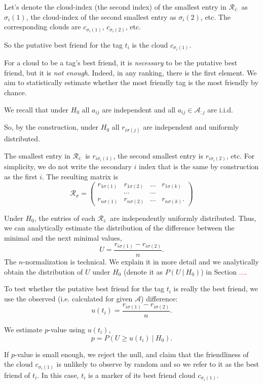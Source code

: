 \documentclass{llncs}
\begin{document}
Let's denote the cloud-index (the second index) of the smallest entry in $\mathcal{R}_{i:}$ as $\sigma_i(1)$, the cloud-index of the second smallest entry as ${\sigma_i(2)}$, etc. The corresponding clouds are $c_{\sigma_{i}(1)}$, $c_{\sigma_{i}(2)}$, etc. 

So the putative best friend for the tag $t_i$ is the cloud $c_{\sigma_{i}(1)}$.

For a cloud to be a tag's best friend, it is \textit{necessary} to be the putative best friend, but it is \textit{not enough}. Indeed, in any ranking, there is the first element. We aim to statistically estimate whether the most friendly tag is the most friendly by chance. 

We recall that under $H_0$ all $a_{ij}$ are independent and all $a_{ij} \in \mathcal{A}_{:j}$ are i.i.d.

So, by the construction, under $H_0$ all $r_{i\sigma(j)}$ are independent and uniformly distributed.

The smallest entry in $\mathcal{R}_{i:}$ is $r_{i\sigma_i(1)}$, the second smallest entry is $r_{i\sigma_i(2)}$, etc. For simplicity, we do not write the secondary $i$ index that is the same by construction as the first $i$. The resulting matrix is 
\[
\mathcal{R}_{\sigma} = \begin{pmatrix}
r_{1\sigma(1)} & r_{1\sigma(2)} & \dots & r_{1\sigma(k)} \\
       &\cdots & \cdots &  \\
r_{n\sigma(1)} & r_{n\sigma(2)} & \dots & r_{n\sigma(k)}.
\end{pmatrix}
\]

Under $H_0$, the entries of each $\mathcal{R}_{i:}$ are independently uniformly distributed. Thus, we can analytically estimate the distribution of the difference between the minimal and the next minimal values,
\[
U = \frac{r_{i\sigma(1)} - r_{i\sigma(2)}}{n}. 
\]
The $n$-normalization is technical. We explain it in more detail and we analytically obtain the distribution of $U$ under $H_0$ (denote it as $P(U ~|~ H_0)$) in Section \textcolor{red}{...}. 

To test whether the putative best friend for the tag $t_i$ is really the best friend, we use the observed  (i.e. calculated for given $\mathcal{A}$) difference:
\[
u(t_i) = \frac{r_{i\sigma(1)} -  r_{i\sigma(2)}}{n}.
\] 

We estimate $p$-value using $u(t_i)$,
\[
p = P\left(U \ge u(t_i)~|~H_0\right). 
\]

If $p$-value is small enough, we reject the null, and claim that the friendliness of the cloud $c_{\sigma_{i}(1)}$ is unlikely to observe by random and so we refer to it as the best friend of $t_i$. In this case, $t_i$ is a marker of its best friend cloud $c_{\sigma_{i}(1)}$.
\end{document}
